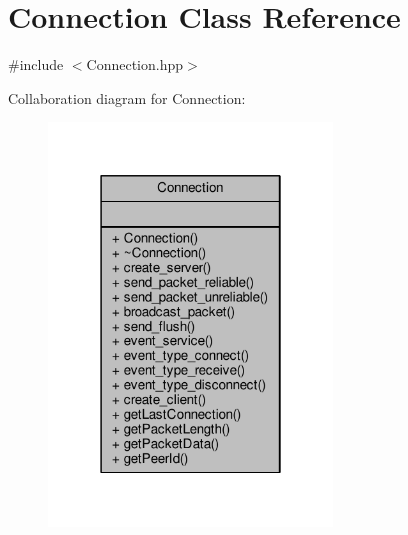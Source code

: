 \hypertarget{class_connection}{}\section{Connection Class Reference}
\label{class_connection}


{\ttfamily \#include $<$Connection.\+hpp$>$}



Collaboration diagram for Connection\+:\nopagebreak
\begin{figure}[H]
\begin{center}
\leavevmode
\includegraphics[width=214pt]{class_connection__coll__graph}
\end{center}
\end{figure}
